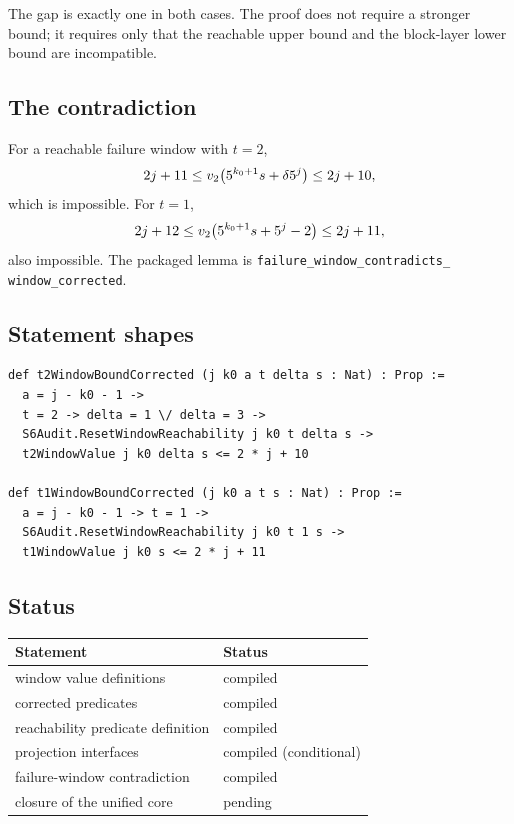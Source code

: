 The gap is exactly one in both cases.  The proof does not require a
stronger bound; it requires only that the reachable upper bound and
the block-layer lower bound are incompatible.

\subsection{The contradiction}

For a reachable failure window with $t=2$,
\begin{equation*}
  2j+11
  \le v_2\!\left(5^{k_0+1}s+\delta5^j\right)
  \le2j+10,
\end{equation*}
which is impossible.  For $t=1$,
\begin{equation*}
  2j+12
  \le v_2\!\left(5^{k_0+1}s+5^j-2\right)
  \le2j+11,
\end{equation*}
also impossible.  The packaged lemma is
\texttt{failure\_\allowbreak window\_\allowbreak contradicts\_\allowbreak
window\_\allowbreak corrected}.

\subsection{Statement shapes}

\begin{verbatim}
def t2WindowBoundCorrected (j k0 a t delta s : Nat) : Prop :=
  a = j - k0 - 1 ->
  t = 2 -> delta = 1 \/ delta = 3 ->
  S6Audit.ResetWindowReachability j k0 t delta s ->
  t2WindowValue j k0 delta s <= 2 * j + 10

def t1WindowBoundCorrected (j k0 a t s : Nat) : Prop :=
  a = j - k0 - 1 -> t = 1 ->
  S6Audit.ResetWindowReachability j k0 t 1 s ->
  t1WindowValue j k0 s <= 2 * j + 11
\end{verbatim}

\subsection{Status}

\begin{center}
\small
\begin{tabular}{@{}p{}p{}@{}}
\toprule
Statement & Status \\
\midrule
window value definitions & compiled \\
corrected predicates & compiled \\
reachability predicate definition & compiled \\
projection interfaces & compiled (conditional) \\
failure-window contradiction & compiled \\
closure of the unified core & pending \\
\bottomrule
\end{tabular}
\end{center}
